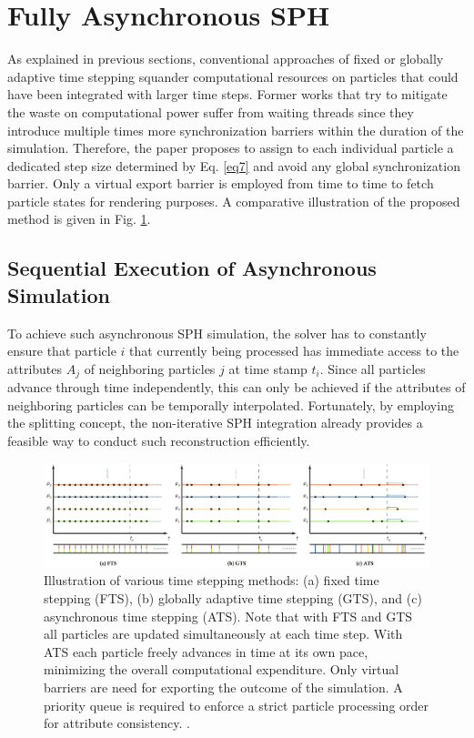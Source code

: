 \documentclass[
	11pt, 
	DIV10,
	ngerman,
	a4paper, 
	oneside, 
	headings=normal, 
	captions=tableheading,
	final, 
	numbers=noenddot
]{scrartcl}
\begin{document}
\section{Fully Asynchronous SPH}

As explained in previous sections, conventional approaches of fixed or globally adaptive time stepping squander computational resources on particles that could have been integrated with larger time steps. Former works that try to mitigate the waste on computational power suffer from waiting threads since they introduce multiple times more synchronization barriers within the duration of the simulation. Therefore, the paper proposes to assign to each individual particle a dedicated step size determined by Eq. \eqref{eq7} and avoid any global synchronization barrier. Only a virtual export barrier is employed from time to time to fetch particle states for rendering purposes. A comparative illustration of the proposed method is given in Fig. \ref{fig3}.

\subsection{Sequential Execution of Asynchronous Simulation}

To achieve such asynchronous SPH simulation, the solver has to constantly ensure that particle $ i $ that currently being processed has immediate access to the attributes $ A_{j} $ of neighboring particles $ j $ at time stamp $ t_{i} $. Since all particles advance through time independently, this can only be achieved if the attributes of neighboring particles can be temporally interpolated. Fortunately, by employing the splitting concept, the non-iterative SPH integration already provides a feasible way to conduct such reconstruction efficiently.

\begin{figure}[tb]
	\centering
	\includegraphics[scale=0.16]{images/4}
	\caption{\label{fig3} Illustration of various time stepping methods: (a) fixed time stepping (FTS), (b) globally adaptive time stepping (GTS), and (c) asynchronous time stepping (ATS). Note that with FTS and GTS all particles are updated simultaneously at each time step. With ATS each particle freely advances in time at its own pace, minimizing the overall computational expenditure. Only virtual barriers are need for exporting the outcome of the simulation. A priority queue is required to enforce a strict particle processing order for attribute consistency. \cite{reinhardt2017fully}.}
\end{figure}
\end{document}
